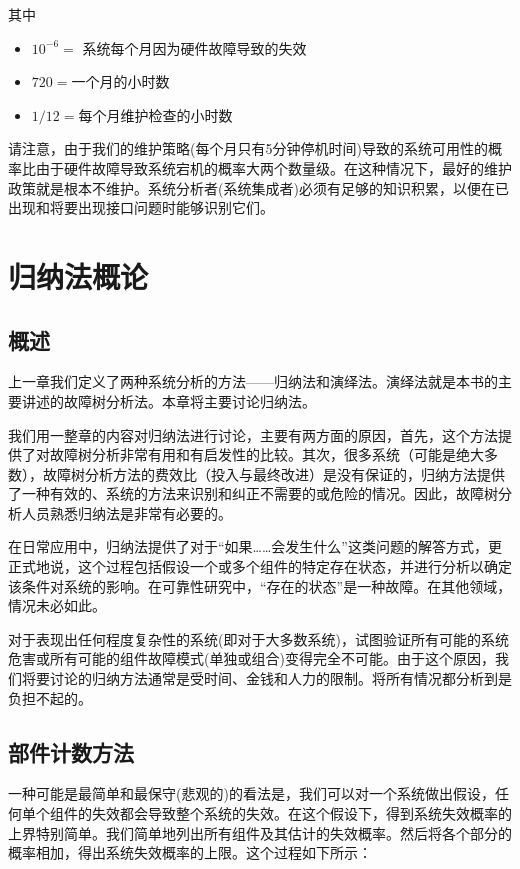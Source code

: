 \documentclass[cn,11pt,chinese]{elegantbook}
\begin{document}
其中

\begin{itemize}
	\item $ 10^{-6} =$ 系统每个月因为硬件故障导致的失效 
	\item $ 720  = $一个月的小时数
	\item $ 1/12  = $每个月维护检查的小时数
\end{itemize}

请注意，由于我们的维护策略(每个月只有5分钟停机时间)导致的系统可用性的概率比由于硬件故障导致系统宕机的概率大两个数量级。在这种情况下，最好的维护政策就是根本不维护。系统分析者(系统集成者)必须有足够的知识积累，以便在已出现和将要出现接口问题时能够识别它们。

\chapter{归纳法概论}
\section{概述}

上一章我们定义了两种系统分析的方法——归纳法和演绎法。演绎法就是本书的主要讲述的故障树分析法。本章将主要讨论归纳法。

我们用一整章的内容对归纳法进行讨论，主要有两方面的原因，首先，这个方法提供了对故障树分析非常有用和有启发性的比较。其次，很多系统（可能是绝大多数），故障树分析方法的费效比（投入与最终改进）是没有保证的，归纳方法提供了一种有效的、系统的方法来识别和纠正不需要的或危险的情况。因此，故障树分析人员熟悉归纳法是非常有必要的。

在日常应用中，归纳法提供了对于“如果……会发生什么”这类问题的解答方式，更正式地说，这个过程包括假设一个或多个组件的特定存在状态，并进行分析以确定该条件对系统的影响。在可靠性研究中，“存在的状态”是一种故障。在其他领域，情况未必如此。

对于表现出任何程度复杂性的系统(即对于大多数系统)，试图验证所有可能的系统危害或所有可能的组件故障模式(单独或组合)变得完全不可能。由于这个原因，我们将要讨论的归纳方法通常是受时间、金钱和人力的限制。将所有情况都分析到是负担不起的。

\section{部件计数方法}

一种可能是最简单和最保守(悲观的)的看法是，我们可以对一个系统做出假设，任何单个组件的失效都会导致整个系统的失效。在这个假设下，得到系统失效概率的上界特别简单。我们简单地列出所有组件及其估计的失效概率。然后将各个部分的概率相加，得出系统失效概率的上限。这个过程如下所示：
\end{document}
